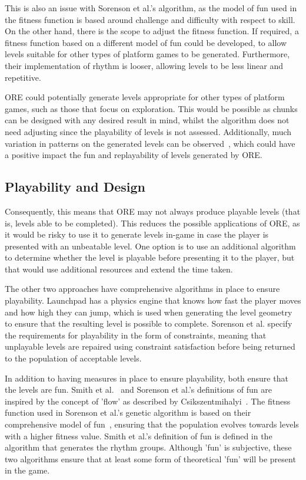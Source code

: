 \documentclass{scrartcl}
\begin{document}
This is also an issue with Sorenson et al.'s algorithm, as the model of fun used in the fitness function is based around challenge and difficulty with respect to skill. On the other hand, there is the scope to adjust the fitness function. If required, a fitness function based on a different model of fun could be developed, to allow levels suitable for other types of platform games to be generated. Furthermore, their implementation of rhythm is looser, allowing levels to be less linear and repetitive.

ORE could potentially generate levels appropriate for other types of platform games, such as those that focus on exploration. This would be possible as chunks can be designed with any desired result in mind, whilst the algorithm does not need adjusting since the playability of levels is not assessed. Additionally, much variation in patterns on the generated levels can be observed~\cite{horn:comparative}, which could have a positive impact the fun and replayability of levels generated by ORE.


\subsection{Playability and Design}
Consequently, this means that ORE may not always produce playable levels (that is, levels able to be completed). This reduces the possible applications of ORE, as it would be risky to use it to generate levels in-game in case the player is presented with an unbeatable level. One option is to use an additional algorithm to determine whether the level is playable before presenting it to the player, but that would use additional resources and extend the time taken.

The other two approaches have comprehensive algorithms in place to ensure playability. Launchpad has a physics engine that knows how fast the player moves and how high they can jump, which is used when generating the level geometry to ensure that the resulting level is possible to complete.
Sorenson et al. specify the requirements for playability in the form of constraints, meaning that unplayable levels are repaired using constraint satisfaction before being returned to the population of acceptable levels. 

In addition to having measures in place to ensure playability, both ensure that the levels are fun. Smith et al.~\cite{smith:rhythm} and Sorenson et al.'s definitions of fun are inspired by the concept of 'flow' as described by Csikszentmihalyi~\cite{csik:flow}. The fitness function used in Sorenson et al.'s genetic algorithm is based on their comprehensive model of fun~\cite{sorenson:fun}, ensuring that the population evolves towards levels with a higher fitness value. Smith et al.'s definition of fun is defined in the algorithm that generates the rhythm groups. Although 'fun' is subjective, these two algorithms ensure that at least some form of theoretical 'fun' will be present in the game.
\end{document}
